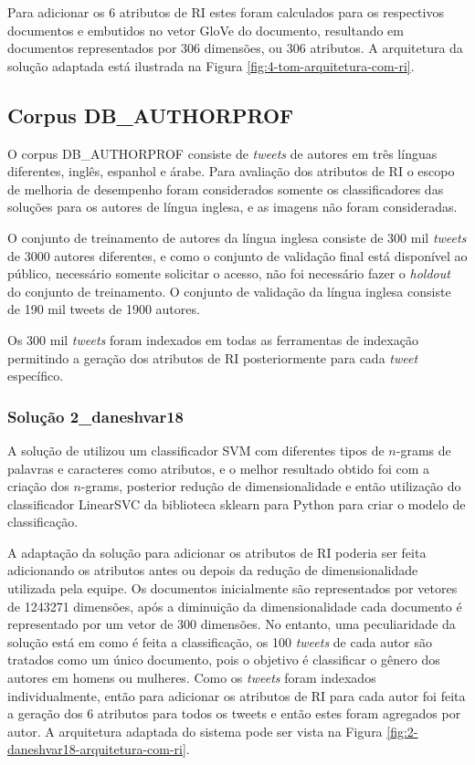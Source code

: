 				

				Para adicionar os 6 atributos de RI estes foram calculados para os respectivos documentos e embutidos no vetor GloVe do documento, resultando em documentos representados por 306 dimensões, ou 306 atributos.
				A arquitetura da solução adaptada está ilustrada na Figura \ref{fig:4-tom-arquitetura-com-ri}.

		\subsection{Corpus DB\_AUTHORPROF}
			O corpus DB\_AUTHORPROF consiste de \textit{tweets} de autores em três línguas diferentes, inglês, espanhol e árabe.
			Para avaliação dos atributos de RI o escopo de melhoria de desempenho foram considerados somente os classificadores das soluções para os autores de língua inglesa, e as imagens não foram consideradas.

			O conjunto de treinamento de autores da língua inglesa consiste de 300 mil \textit{tweets} de 3000 autores diferentes, e como o conjunto de validação final está disponível ao público, necessário somente solicitar o acesso, não foi necessário fazer o \textit{holdout} do conjunto de treinamento.
			O conjunto de validação da língua inglesa consiste de 190 mil tweets de 1900 autores.

			Os 300 mil \textit{tweets} foram indexados em todas as ferramentas de indexação permitindo a geração dos atributos de RI posteriormente para cada \textit{tweet} específico.

			\subsubsection{Solução 2\_daneshvar18}
				A solução de  utilizou um classificador SVM com diferentes tipos de $n$-grams de palavras e caracteres como atributos, e o melhor resultado obtido foi com a criação dos $n$-grams, posterior redução de dimensionalidade e então utilização do classificador LinearSVC da biblioteca sklearn para Python para criar o modelo de classificação.

				A adaptação da solução para adicionar os atributos de RI poderia ser feita adicionando os atributos antes ou depois da redução de dimensionalidade utilizada pela equipe.
				Os documentos inicialmente são representados por vetores de 1243271 dimensões, após a diminuição da dimensionalidade cada documento é representado por um vetor de 300 dimensões.
				No entanto, uma peculiaridade da solução está em como é feita a classificação, os 100 \textit{tweets} de cada autor são tratados como um único documento, pois o objetivo é classificar o gênero dos autores em homens ou mulheres.
				Como os \textit{tweets} foram indexados individualmente, então para adicionar os atributos de RI para cada autor foi feita a geração dos 6 atributos para todos os tweets e então estes foram agregados por autor.
				A arquitetura adaptada do sistema pode ser vista na Figura \ref{fig:2-daneshvar18-arquitetura-com-ri}.

